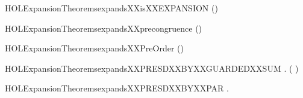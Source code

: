 \begin{SaveVerbatim}{HOLExpansionTheoremsexpandsXXisXXEXPANSION}
\HOLTokenTurnstile{}  ()
\end{SaveVerbatim}
\newcommand{\HOLExpansionTheoremsexpandsXXisXXEXPANSION}{\UseVerbatim{HOLExpansionTheoremsexpandsXXisXXEXPANSION}}
\begin{SaveVerbatim}{HOLExpansionTheoremsexpandsXXprecongruence}
\HOLTokenTurnstile{}  ()
\end{SaveVerbatim}
\newcommand{\HOLExpansionTheoremsexpandsXXprecongruence}{\UseVerbatim{HOLExpansionTheoremsexpandsXXprecongruence}}
\begin{SaveVerbatim}{HOLExpansionTheoremsexpandsXXPreOrder}
\HOLTokenTurnstile{}  ()
\end{SaveVerbatim}
\newcommand{\HOLExpansionTheoremsexpandsXXPreOrder}{\UseVerbatim{HOLExpansionTheoremsexpandsXXPreOrder}}
\begin{SaveVerbatim}{HOLExpansionTheoremsexpandsXXPRESDXXBYXXGUARDEDXXSUM}
\HOLTokenTurnstile{} \HOLSymConst{\HOLTokenForall{}}     .
          \HOLSymConst{\HOLTokenConj{}}    \HOLSymConst{\HOLTokenImp{}}
        \HOLSymConst{\ensuremath{+}}   ( \HOLSymConst{\ensuremath{+}} )
\end{SaveVerbatim}
\newcommand{\HOLExpansionTheoremsexpandsXXPRESDXXBYXXGUARDEDXXSUM}{\UseVerbatim{HOLExpansionTheoremsexpandsXXPRESDXXBYXXGUARDEDXXSUM}}
\begin{SaveVerbatim}{HOLExpansionTheoremsexpandsXXPRESDXXBYXXPAR}
\HOLTokenTurnstile{} \HOLSymConst{\HOLTokenForall{}}   .
          \HOLSymConst{\HOLTokenConj{}}    \HOLSymConst{\HOLTokenImp{}}
        \HOLSymConst{\ensuremath{\parallel}}    \HOLSymConst{\ensuremath{\parallel}} 
\end{SaveVerbatim}
